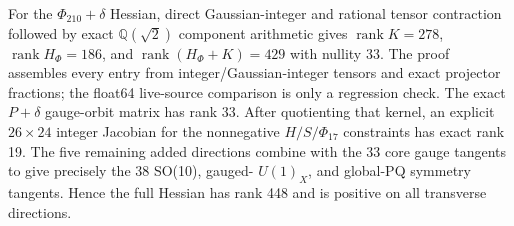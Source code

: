 \documentclass[11pt,a4paper]{article}
\begin{document}
For the $\Phi_{210}+\delta$ Hessian, direct Gaussian-integer and rational
tensor contraction followed by exact $\mathbb Q(\sqrt{2})$ component
arithmetic gives $\operatorname{rank}K=278$,
$\operatorname{rank}H_\Phi=186$, and
$\operatorname{rank}(H_\Phi+K)=429$ with nullity 33. The proof assembles every
entry from integer/Gaussian-integer tensors and exact projector fractions; the
float64 live-source comparison is only a regression check. The exact
$P+\delta$ gauge-orbit matrix has rank 33. After quotienting that kernel, an
explicit $26\times24$ integer Jacobian for the nonnegative $H/S/\Phi_{17}$
constraints has exact rank 19. The five remaining added directions combine
with the 33 core gauge tangents to give precisely the 38 SO(10), gauged-
$U(1)_X$, and global-PQ symmetry tangents. Hence the full Hessian has rank 448
and is positive on all transverse directions.
\end{document}
